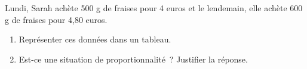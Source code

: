 \documentclass[exercice]{thedocument}%
\begin{document}
%
Lundi, Sarah achète 500 g de fraises pour 4 euros et le lendemain, elle achète
600 g de fraises pour 4,80 euros.
\begin{enumerate}
    \item Représenter ces données dans un tableau.
    \item Est-ce une situation de proportionnalité~? Justifier la réponse.
\end{enumerate}
\end{document}
